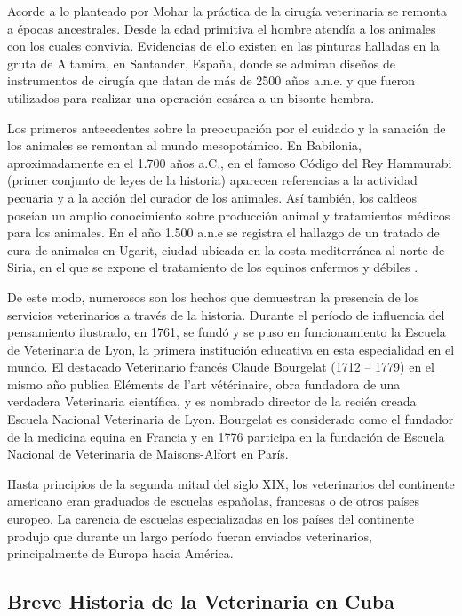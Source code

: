 Acorde a lo planteado por Mohar  la práctica de la cirugía veterinaria se remonta a épocas ancestrales. Desde la edad primitiva el hombre atendía a los animales con los cuales convivía. Evidencias de ello existen en las pinturas halladas en la gruta de Altamira, en Santander, España, donde se admiran diseños de instrumentos de cirugía que datan de más de 2500 años a.n.e. y que fueron utilizados para realizar una operación cesárea a un bisonte hembra.   

Los primeros antecedentes sobre la preocupación por el cuidado y la sanación de los animales se remontan al mundo mesopotámico. En Babilonia, aproximadamente en el 1.700 años a.C., en el famoso Código del Rey Hammurabi (primer conjunto de leyes de la historia) aparecen referencias a la actividad pecuaria y a la acción del curador de los animales. Así también, los caldeos poseían un amplio conocimiento sobre producción animal y tratamientos médicos para los animales. En el año 1.500 a.n.e se registra el hallazgo de un tratado de cura de animales en Ugarit, ciudad ubicada en la costa mediterránea al norte de Siria, en el que se expone el tratamiento de los equinos enfermos y débiles . 

De este modo, numerosos son los hechos que demuestran la presencia de los servicios veterinarios a través de la historia. 
Durante el período de influencia del pensamiento ilustrado, en 1761, se fundó y se puso en funcionamiento la Escuela de Veterinaria de Lyon, la primera institución educativa en esta especialidad en el mundo. El destacado Veterinario francés Claude Bourgelat (1712 – 1779) en el mismo año publica Eléments de l’art vétérinaire, obra fundadora de una verdadera Veterinaria científica, y es nombrado director de la recién creada Escuela Nacional Veterinaria de Lyon. Bourgelat es considerado como el fundador de la medicina equina en Francia y en 1776 participa en la fundación de Escuela Nacional de Veterinaria de Maisons-Alfort en París.  

Hasta principios de la segunda mitad del siglo XIX, los veterinarios del continente americano eran graduados de escuelas españolas, francesas o de otros países europeo. La carencia de escuelas especializadas en los países del continente produjo que durante un largo período fueran enviados veterinarios, principalmente de Europa hacia América.  



\subsection{Breve Historia de la Veterinaria en Cuba}

